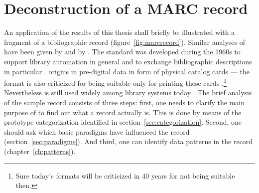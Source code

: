 
\section{Deconstruction of a MARC record}
\label{appendixD}

An application of the results of this thesis shall briefly be illustrated with
a fragment of a bibliographic record (figure~\ref{fig:marcrecord}). Similar
analyses of  have been given by \textcite{Thomale2010} and by
\textcite{Coyle2011}.  The  standard
was developed during the 1960s to support library automation in general and to
exchange bibliographic descriptions in particular
\cite{McCallum2009,McCallum2002,Avram1975}.   origins in pre-digital
data in form of physical catalog cards --- the format is also criticized for
being suitable only for printing these cards
\cite{Tennant2002,Coyle2005}.\footnote{Sure today's formats will be criticized
in 40 years for not being suitable then.} Nevertheless  is still
used widely among library systems today .  The brief analysis of the sample
record consists of three steps: first, one needs to clarify the main purpose of
 to find out what a record actually is.  This is done by means of
the prototype categorization identified in section~\ref{sec:categorization}.
Second, one should ask which basic paradigms have influenced the record
(section~\ref{sec:paradigms}).  And third, one can identify data patterns in
the record (chapter~\ref{ch:patterns}).


